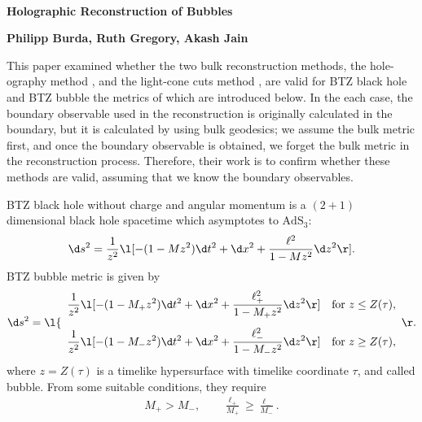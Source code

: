 \documentclass[12pt]{article}
\date{}
\renewcommand{\thefootnote}{\fnsymbol{footnote}}
\begin{document}
{\Large{}\\[2mm]
\textbf{Holographic Reconstruction of Bubbles\cite{Burda:2018rpb}
}
}

\noindent
\hfill
\textbf{Philipp Burda, Ruth Gregory, Akash Jain}%

\renewcommand{\thefootnote}{\arabic{footnote})}
\setcounter{footnote}{0}
\vspace{12pt}
This paper examined whether the two bulk reconstruction methods, the hole-ography method  \cite{Balasubramanian:2013lsa,Czech:2014ppa}, and the light-cone cuts method \cite{Engelhardt:2016wgb} , are valid for BTZ black hole and BTZ bubble the metrics of which are introduced below.
In the each case, the boundary observable used in the reconstruction is originally calculated in the boundary, but it is calculated by using bulk geodesics; we assume the bulk metric first, and once the boundary observable is obtained, we forget the bulk metric in the reconstruction process.
	Therefore, their work is to confirm whether these methods are valid, assuming that we know the boundary observables.

BTZ black hole without charge and angular momentum is a $(2+1)$ dimensional black hole spacetime which asymptotes to $\mathrm{AdS}_3$:
\begin{align}
	\d s^2 = \frac{1}{z^2}\l[-(1-Mz^2)\d t^2 + \d x^2 + \frac{\ell^2}{1-Mz^2}\d z^2\r].
\end{align}
BTZ bubble metric is given by
\begin{align}
	\d s^2 = 
	\l\{
		\begin{array}{cc}
			\displaystyle \frac{1}{z^2}\l[-(1-M_+z^2)\d t^2 + \d x^2 + \frac{\ell_+^2}{1-M_+z^2}\d z^2\r] & \mathrm{for}~z\le Z(\tau),\\[5mm]
			\displaystyle\frac{1}{z^2}\l[-(1-M_-z^2)\d t^2 + \d x^2 + \frac{\ell_-^2}{1-M_-z^2}\d z^2\r] & \mathrm{for}~z\ge Z(\tau),
		\end{array}
	\r.
\end{align}
where $z = Z(\tau)$ is  a timelike hypersurface with timelike coordinate $\tau$, and called bubble.
From some suitable conditions, they require
\begin{align}
	M_+ > M_-,\qquad \frac{\ell_+}{M_+} \geq \frac{\ell_-}{M_-}.
\end{align}
\end{document}
